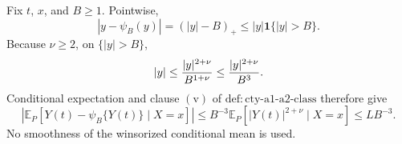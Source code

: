 Fix \(t\), \(x\), and \(B\geq1\).  Pointwise,
\[
 |y-\psi_B(y)|=(|y|-B)_+\leq |y|\mathbf1\{|y|>B\}.
\]
Because \(\nu\geq2\), on \(\{|y|>B\}\),
\[
 |y|\leq {|y|^{2+\nu}\over B^{1+\nu}}
 \leq {|y|^{2+\nu}\over B^3}.
\]
Conditional expectation and clause \(\mathrm{(v)}\) of \(\mathrm{def:cty\text{-}a1\text{-}a2\text{-}class}\) therefore give
\[
 \left|\mathbb E_P\!\left[Y(t)-\psi_B\{Y(t)\}\mid X=x\right]\right|
 \leq B^{-3}\mathbb E_P[|Y(t)|^{2+\nu}\mid X=x]
 \leq LB^{-3}.
\]
No smoothness of the winsorized conditional mean is used.